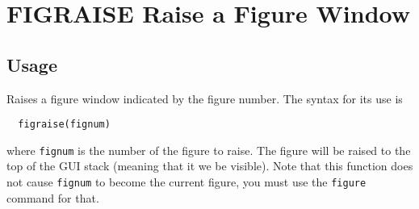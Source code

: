 \section{FIGRAISE Raise a Figure Window}

\subsection{Usage}

Raises a figure window indicated by the figure number.  The syntax for
its use is
\begin{verbatim}
  figraise(fignum)
\end{verbatim}
where \verb|fignum| is the number of the figure to raise.  The figure will
be raised to the top of the GUI stack (meaning that it we be visible).
Note that this function does not cause \verb|fignum| to become the current
figure, you must use the \verb|figure| command for that.

